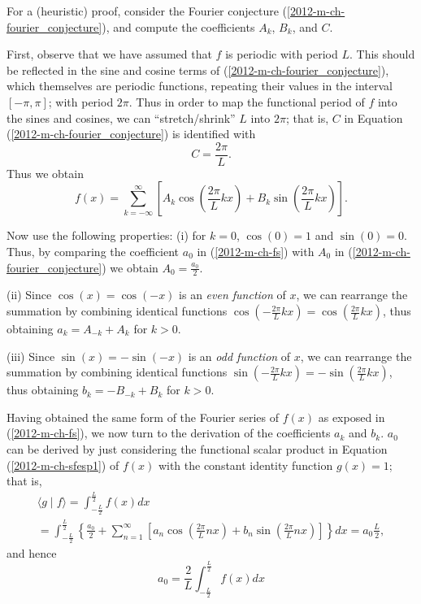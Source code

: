 {\color{OliveGreen}
\bproof

For a (heuristic) proof, consider the Fourier conjecture (\ref{2012-m-ch-fourier_conjecture}),
and compute the coefficients $A_k$, $B_k$, and $C$.

First, observe that we have assumed that $f$ is periodic with period $L$.
This should be reflected in the sine and cosine terms of   (\ref{2012-m-ch-fourier_conjecture}),
which themselves are periodic functions, repeating their values in the interval $[- \pi , \pi ]$; with period $2\pi$.
Thus in order to map the functional period of $f$ into the sines and cosines, we can ``stretch/shrink''
$L$ into $2\pi$; that is,
$C$ in Equation  (\ref{2012-m-ch-fourier_conjecture}) is identified with
\begin{equation}
C=\frac{2\pi}{L}.
\label{2012-m-ch-pfc1}
\end{equation}
Thus we obtain
\begin{equation}
f(x)= \sum_{k=-\infty}^\infty
\left[ A_k \cos \left(\frac{2\pi}{L} k x\right) + B_k \sin \left(\frac{2\pi}{L} k x\right)\right].
\label{2012-m-ch-pfc2}
\end{equation}

Now use the following properties:
(i)
for $k=0$, $\cos (0)=1$ and $\sin (0)=0$.
Thus, by comparing the coefficient $a_0$ in
(\ref{2012-m-ch-fs}) with $A_0$ in (\ref{2012-m-ch-fourier_conjecture})
we obtain  $A_0=\frac{a_0}{2}$.

(ii) Since $\cos (x)= \cos (-x)$ is an {\em even function} of $x$, we can rearrange the summation
by combining identical functions  $\cos (-\frac{2\pi}{L} k x) = \cos (\frac{2\pi}{L} k x) $,
thus obtaining $a_k = A_{-k}+A_k$ for $k>0$.

(iii) Since $\sin (x)= -\sin (-x)$ is an {\em odd function} of $x$, we can rearrange the summation
by combining identical functions  $\sin (-\frac{2\pi}{L} k x) =  -\sin (\frac{2\pi}{L} k x)$,
thus obtaining $b_k = -B_{-k}+B_k$ for $k>0$.

Having obtained the same form of the Fourier series of $f(x)$ as exposed in (\ref{2012-m-ch-fs}),
we now turn to the derivation of the coefficients $a_k$ and $b_k$.
$a_0$ can be derived by just considering the functional scalar product in
Equation (\ref{2012-m-ch-sfesp1})
of $f(x)$ with the constant identity function $g(x)=1$; that is,
\begin{equation}
\begin{split}
\langle   g  \mid f \rangle
=
\int_{-\frac{L}{2}}^\frac{L}{2} f(x)  dx \\
 =
\int_{-\frac{L}{2}}^\frac{L}{2} \left\{ \frac{a_0}{2}+\sum_{n=1}^\infty
\left[a_n\cos\left(\frac{2\pi}{L} n x\right)+b_n\sin\left(\frac{2\pi}{L} n x\right)\right]\right\}  dx  =
a_0\frac{L}{2}
,
\end{split}
\label{2012-m-ch-sfespnn}
\end{equation}
and hence
\begin{equation}
a_0 = \frac{2}{L} \int_{-\frac{L}{2}}^\frac{L}{2} f(x)  dx
\label{2012-m-ch-sfespnn2}
\end{equation}

}
